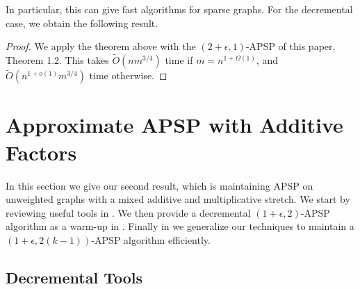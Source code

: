 \documentclass[11pt]{article}
\newtheorem{corollary}[theorem]{Corollary}
\theoremstyle{definition}
\theoremstyle{remark}
\newcommand{\ttodo}[1]{\todo[color=orange!20]{T: #1}}
\begin{document}
In particular, this can give fast algorithms for sparse graphs.
For the decremental case, we obtain the following result. 
\thmtwoUnw*
\begin{proof}
    We apply the theorem above with the $(2+\epsilon,1)$-APSP of this paper, Theorem 1.2. This takes $\tilde O( nm^{3/4})$ time if $m=n^{1+\Omega(1)}$, and $\tilde O( n^{1+o(1)}m^{3/4})$ time otherwise.
\end{proof}



\newpage
\section{Approximate APSP with Additive Factors}\label{sc:additive}
In this section we give our second result, which is maintaining APSP on unweighted graphs with a mixed additive and multiplicative stretch. We start by reviewing useful tools in .  We then provide a decremental $(1+\epsilon, 2)$-APSP algorithm as a warm-up in . Finally in  we generalize our techniques to maintain a $(1+\epsilon, 2(k-1))$-APSP algorithm efficiently.


\subsection{Decremental Tools}  \label{sec:additive_tools}
\end{document}
